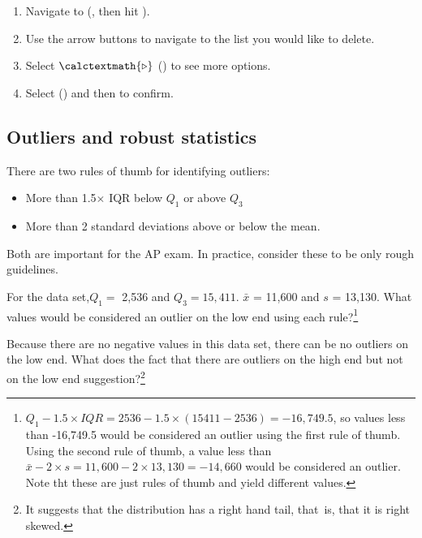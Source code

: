 \begin{tipBox}{
\begin{enumerate}
\setlength{\itemsep}{0mm}
\item Navigate to  (, then hit ).
\item Use the arrow buttons to navigate to the list you would like to delete.
\item Select $\calctextmath{\triangleright}$ () to see more options.
\item Select  () and then  to confirm.
\end{enumerate}
}
\end{tipBox}


\subsection{Outliers and robust statistics}

\begin{termBox}{
There are two rules of thumb for identifying outliers:
\begin{itemize}
\setlength{\itemsep}{0mm}
\item More than 1.5$\times$ IQR below $Q_1$ or above $Q_3$
\item More than 2 standard deviations above or below the mean.
\end{itemize}
Both are important for the AP exam. In practice, consider these to be only rough guidelines.}
\end{termBox}

\begin{exercise}For the  data set,$Q_1=$ 2,536 and $Q_3=15,411$. $\bar{x}$ = 11,600  and $s$ = 13,130. What values would be considered an outlier on the low end using each rule?\footnote{ $Q_1 - 1.5\times IQR = 2536 - 1.5 \times (15411 - 2536) = -16,749.5$, so values less than -16,749.5 would be considered an outlier using the first rule of thumb. Using the second rule of thumb, a value less than $\bar{x} - 2\times s = 11,600 - 2 \times 13,130 = -14,660$ would be considered an outlier. Note tht these are just rules of thumb and yield different values.}
\end{exercise}

\begin{exercise} Because there are no negative values in this data set, there can be no outliers on the low end. What does the fact that there are outliers on the high end but not on the low end suggestion?\footnote{It suggests that the distribution has a right hand tail, that~is, that it is right skewed.}
\end{exercise}

